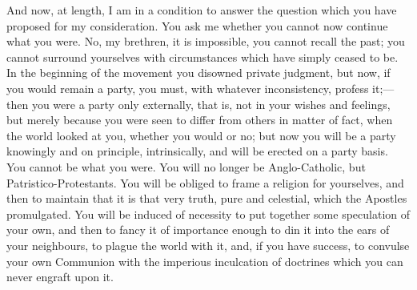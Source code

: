 And now, at length, I am in a condition to answer the question
which you have proposed for my consideration. You ask me whether you
cannot now continue what you were. No, my brethren, it is impossible,
you cannot recall the past; you cannot surround yourselves with
circumstances which have simply ceased to be. In the beginning of the
movement you disowned private judgment, but now, if you would remain a
party, you must, with whatever inconsistency, profess it;—then you
were a party only externally, that is, not in your wishes and
feelings, but merely because you were seen to differ from others in
matter of fact, when the world looked at you, whether you would or no;
but now you will be a party knowingly and on principle, intrinsically,
and will be erected on a party basis. You cannot be what you were. You
will no longer be Anglo-Catholic, but Patristico-Protestants. You will
be obliged to frame a religion for yourselves, and then to maintain
that it is that very truth, pure and celestial, which the Apostles
promulgated. You will be induced of necessity to put together some
speculation of your own, and then to fancy it of importance enough to
din it into the ears of your neighbours, to plague the world with it,
and, if you have success, to convulse your own Communion with the
imperious inculcation of doctrines which you can never engraft upon
it.

